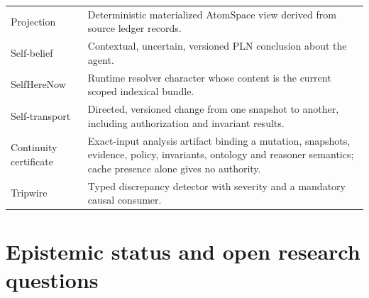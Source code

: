 \documentclass[11pt,oneside]{report}
\begin{document}
\begin{longtable}{@{}L{1.65in}L{4.90in}@{}}
Projection & Deterministic materialized AtomSpace view derived from source ledger records. \\
Self-belief & Contextual, uncertain, versioned PLN conclusion about the agent. \\
SelfHereNow & Runtime resolver character whose content is the current scoped indexical bundle. \\
Self-transport & Directed, versioned change from one snapshot to another, including authorization and invariant results. \\
Continuity certificate & Exact-input analysis artifact binding a mutation, snapshots, evidence, policy, invariants, ontology and reasoner semantics; cache presence alone gives no authority. \\
Tripwire & Typed discrepancy detector with severity and a mandatory causal consumer. \\
\bottomrule
\end{longtable}

\chapter{Epistemic status and open research questions}
\end{document}
